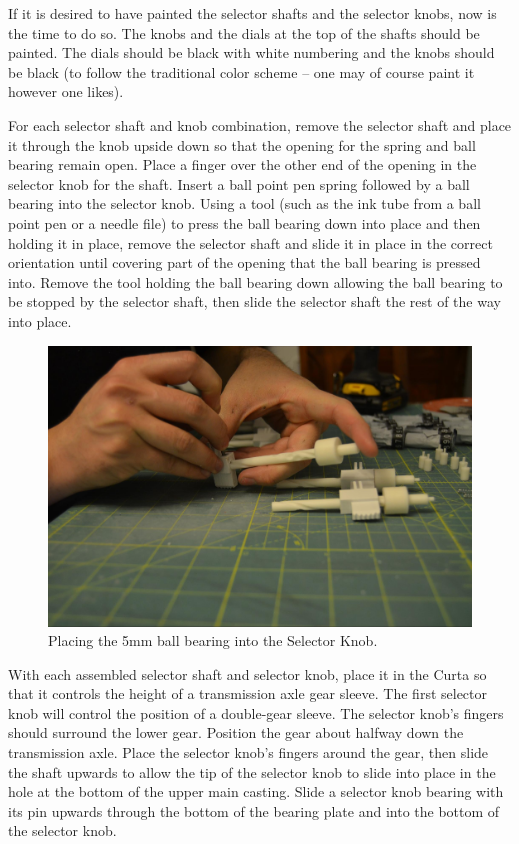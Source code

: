 \documentclass[openany]{book}
\begin{document}
If it is desired to have painted the selector shafts and the selector knobs, now is the time to do so. The knobs and the dials at the top of the shafts should be painted. The dials should be black with white numbering and the knobs should be black (to follow the traditional color scheme -- one may of course paint it however one likes).

For each selector shaft and knob combination, remove the selector shaft and place it through the knob upside down so that the opening for the spring and ball bearing remain open. Place a finger over the other end of the opening in the selector knob for the shaft. Insert a ball point pen spring followed by a ball bearing into the selector knob. Using a tool (such as the ink tube from a ball point pen or a needle file) to press the ball bearing down into place and then holding it in place, remove the selector shaft and slide it in place in the correct orientation until covering part of the opening that the ball bearing is pressed into. Remove the tool holding the ball bearing down allowing the ball bearing to be stopped by the selector shaft, then slide the selector shaft the rest of the way into place.

\begin{figure}[!ht]
	\centering
	\includegraphics[width=.75\textwidth]{images/image49.jpg}
	\caption{Placing the 5mm ball bearing into the Selector Knob.}
	\label{fig:image49}	
\end{figure}


With each assembled selector shaft and selector knob, place it in the Curta so that it controls the height of a transmission axle gear sleeve. The first selector knob will control the position of a double-gear sleeve. The selector knob’s fingers should surround the lower gear. Position the gear about halfway down the transmission axle. Place the selector knob’s fingers around the gear, then slide the shaft upwards to allow the tip of the selector knob to slide into place in the hole at the bottom of the upper main casting. Slide a selector knob bearing with its pin upwards through the bottom of the bearing plate and into the bottom of the selector knob.
\end{document}
